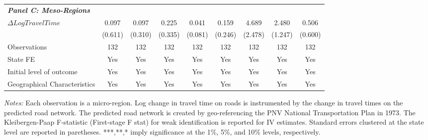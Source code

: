 \begin{table}
{\begin{tabular}{l*{8}{c}}
\multicolumn{8}{l}{\linebreak \textbf{\textit{Panel C: Meso-Regions}}} \\
$\Delta Log Travel Time$&       0.097         &       0.097         &       0.225         &       0.041         &       0.159         &       4.689\sym{*}  &       2.480\sym{*}  &       0.506         \\
&     (0.611)         &     (0.310)         &     (0.335)         &     (0.081)         &     (0.246)         &     (2.478)         &     (1.247)         &     (0.600)         \\
\hline
Observations        &         132         &         132         &         132         &         132         &         132         &         132         &         132         &         132         \\
State FE            &         Yes         &         Yes         &         Yes         &         Yes         &         Yes         &         Yes         &         Yes         &         Yes         \\
Initial level of outcome&         Yes         &         Yes         &         Yes         &         Yes         &         Yes         &         Yes         &         Yes         &         Yes         \\
Geographical Characteristics&         Yes         &         Yes         &         Yes         &         Yes         &         Yes         &         Yes         &         Yes         &         Yes         \\
\hline\hline
\end{tabular}}
\endgroup
\begin{minipage}{\linewidth}
    \vspace{0.1cm}
    {\footnotesize \textit{Notes: }  Each observation is a micro-region. Log change in travel time on roads is instrumented by the change in travel times on the predicted road network. The predicted road network is created by geo-referencing the PNV National Transportation Plan in 1973. The Kleibergen-Paap F-statistic (First-stage F stat) for weak identification is reported for IV estimates. Standard errors clustered at the state level are reported in paretheses. ***,**,* imply significance at the 1\%, 5\%, and 10\% levels, respectively.}
\end{minipage}
\end{table}
